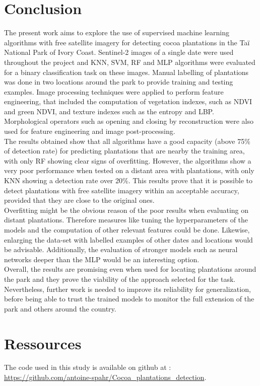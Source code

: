 \documentclass[a4paper, 12pt]{article}
\begin{document}
\section{Conclusion}
    The present work aims to explore the use of supervised machine learning algorithms with free satellite imagery for detecting cocoa plantations in the Taï National Park of Ivory Coast. Sentinel-2 images of a single date were used throughout the project and KNN, SVM, RF and MLP algorithms were evaluated for a binary classification task on these images. Manual labelling of plantations was done in two locations around the park to provide training and testing examples. Image processing techniques were applied to perform feature engineering, that included the computation of vegetation indexes, such as NDVI and green NDVI, and texture indexes such as the entropy and LBP. Morphological operators such as opening and closing by reconstruction were also used for feature engineering and image post-processing.\\
    The results obtained show that all algorithms have a good capacity (above 75\% of detection rate) for predicting plantations that are nearby the training area, with only RF showing clear signs of overfitting. However, the algorithms show a very poor performance when tested on a distant area with plantations, with only KNN showing a detection rate over 20\%. This results prove that it is possible to detect plantations with free satellite imagery within an acceptable accuracy, provided that they are close to the original ones.\\
    Overfitting might be the obvious reason of the poor results when evaluating on distant plantations. Therefore measures like tuning the hyperparameters of the models and the computation of other relevant features could be done. Likewise, enlarging the data-set with labelled examples of other dates and locations would be advisable. Additionally, the evaluation of stronger models such as neural networks deeper than the MLP would be an interesting option.\\
    Overall, the results are promising even when used for locating plantations around the park and they prove the viability of the approach selected for the task. Nevertheless, further work is needed to improve its reliability for generalization, before being able to trust the trained models to monitor the full extension of the park and others around the country.

\newpage
\section*{Ressources}
The code used in this study is available on github at :  \url{https://github.com/antoine-spahr/Cocoa_plantations_detection}.

\footnotesize


\end{document}
